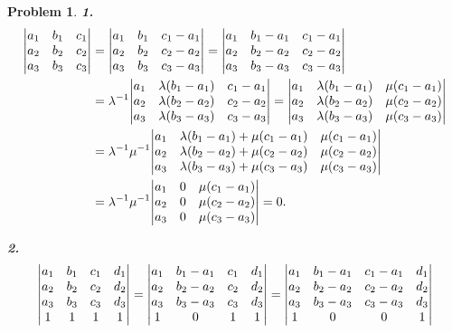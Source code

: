 \documentclass{article}
\newcommand{\subno}[1]{\par\noindent\textbf{#1}}
\theoremstyle{pprop}
\newtheorem{problem}{Problem}[section]
\begin{document}
\begin{problem}
  \subno{1.}
\begin{align*}
\mqty|a_1 & b_1 & c_1 \\a_2 & b_2 & c_2 \\a_3 & b_3 & c_3 \\|
& =
\mqty|a_1 & b_1 & c_1-a_1 \\a_2 & b_2 & c_2-a_2 \\a_3 & b_3 & c_3-a_3 \\|
=
\mqty|a_1 & b_1-a_1 & c_1-a_1 \\a_2 & b_2-a_2 & c_2-a_2 \\a_3 & b_3-a_3 & c_3-a_3 \\| \\
& = \lambda^{-1}
\mqty|a_1 & \lambda(b_1-a_1) & c_1-a_1 \\a_2 & \lambda(b_2-a_2) & c_2-a_2 \\a_3 & \lambda(b_3-a_3) & c_3-a_3 \\|
=\mqty|a_1 & \lambda(b_1-a_1) & \mu(c_1-a_1) \\a_2 & \lambda(b_2-a_2) & \mu(c_2-a_2) \\a_3 & \lambda(b_3-a_3) & \mu(c_3-a_3) \\| \\  
& =  \lambda^{-1} \mu^{-1}
\mqty|a_1 & \lambda(b_1-a_1)+\mu(c_1-a_1) & \mu(c_1-a_1) \\a_2 & \lambda(b_2-a_2)+\mu(c_2-a_2) & \mu(c_2-a_2) \\a_3 & \lambda(b_3-a_3)+\mu(c_3-a_3) & \mu(c_3-a_3) \\| \\
& =   \lambda^{-1} \mu^{-1}
\mqty|a_1 & 0 & \mu(c_1-a_1) \\a_2 & 0 & \mu(c_2-a_2) \\a_3 & 0 & \mu(c_3-a_3) \\| =0.
\end{align*}  
\subno{2.}
\begin{align*}
\mqty|a_1 & b_1 & c_1 & d_1\\a_2 & b_2 & c_2 & d_2\\a_3 & b_3 & c_3 & d_3\\ 1 & 1 & 1 & 1\\|  
& =
\mqty|a_1 & b_1-a_1 & c_1 & d_1\\a_2 & b_2-a_2 & c_2 & d_2\\a_3 & b_3-a_3 & c_3 & d_3\\ 1 & 0 & 1 & 1\\|
=
\mqty|a_1 & b_1-a_1 & c_1-a_1 & d_1\\a_2 & b_2-a_2 & c_2-a_2 & d_2\\a_3 & b_3-a_3 & c_3-a_3 & d_3\\ 1 & 0 & 0 & 1\\|  \\

\end{align*}
\end{problem}
\end{document}
